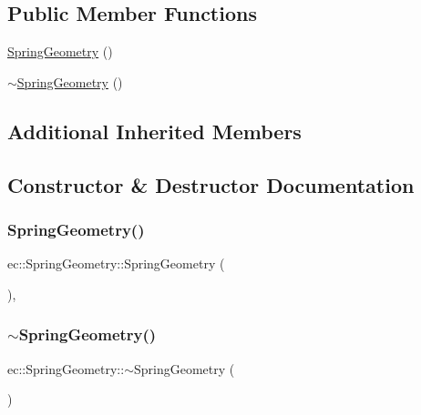 \subsection*{Public Member Functions}
\begin{DoxyCompactItemize}
\item 
\mbox{\hyperlink{classec_1_1_spring_geometry_afc2aa4b3e49cc72083f9b3bc1b1d22be}{Spring\+Geometry}} ()
\item 
\mbox{\hyperlink{classec_1_1_spring_geometry_aaf7c2395d3d548c549eb76a10c85a60e}{$\sim$\+Spring\+Geometry}} ()
\end{DoxyCompactItemize}
\subsection*{Additional Inherited Members}


\subsection{Constructor \& Destructor Documentation}
\mbox{\label{classec_1_1_spring_geometry_afc2aa4b3e49cc72083f9b3bc1b1d22be}} 
\subsubsection{\texorpdfstring{Spring\+Geometry()}{SpringGeometry()}}
{\footnotesize\ttfamily ec\+::\+Spring\+Geometry\+::\+Spring\+Geometry (\begin{DoxyParamCaption}{ }\end{DoxyParamCaption})\hspace{0.3cm}{\ttfamily [explicit]}, {\ttfamily [default]}}

\mbox{\label{classec_1_1_spring_geometry_aaf7c2395d3d548c549eb76a10c85a60e}} 
\subsubsection{\texorpdfstring{$\sim$\+Spring\+Geometry()}{~SpringGeometry()}}
{\footnotesize\ttfamily ec\+::\+Spring\+Geometry\+::$\sim$\+Spring\+Geometry (\begin{DoxyParamCaption}{ }\end{DoxyParamCaption})\hspace{0.3cm}{\ttfamily [default]}}



